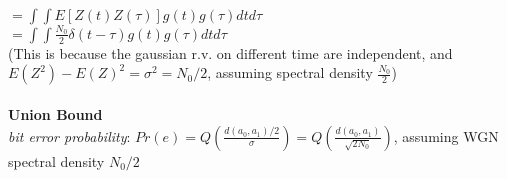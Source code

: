\documentclass [12pt] {article}
\begin{document}
\begin{spacing}{1.5}
\begin{multicols}{2}
$ =\int \int E[Z(t)Z(\tau)] g(t) g(\tau) dt d\tau $\\
$=\int \int \frac{N_0}{2}\delta(t-\tau) g(t) g(\tau) dt d\tau $\\
(This is because the gaussian r.v. on different time are independent, and $E(Z^2)-E(Z)^2 = \sigma ^2 = N_0/2$, assuming spectral density $\frac{N_0}{2}$)\\
~\\
\textbf{Union Bound}\\
\emph{bit error probability}: $Pr(e) = Q(\frac{d(a_0, a_1)/2}{\sigma})= Q(\frac{d(a_0, a_1)}{\sqrt{2 N_0}})$, assuming WGN spectral density $N_0/2$
\end{multicols}
\end{spacing}
\end{document}
